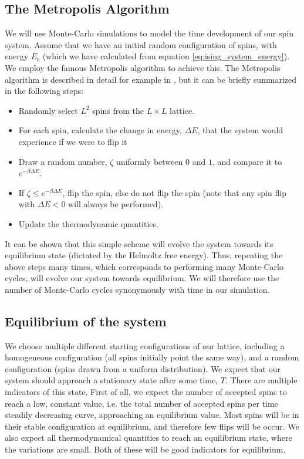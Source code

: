 \documentclass[a4paper, 10pt]{article}
\begin{document}
\subsection{The Metropolis Algorithm}\label{Monte-Carlo_algo}
We will use Monte-Carlo simulations to model the time development of our spin system. Assume that we have an initial random configuration of spins, with energy $E_b$ (which we have calculated from equation \ref{eq:ising_system_energy}). We employ the famous Metropolis algorithm to achieve this. The Metropolis algorithm is described in detail for example in \cite{Metropolis}, but it can be briefly summarized in the following steps:
\begin{itemize}
\item Randomly select $L^2$ spins from the $L\times L$ lattice.
\item For each spin, calculate the change in energy, $\Delta E$, that the system would experience if we were to flip it
\item Draw a random number, $\zeta$ uniformly between $0$ and $1$, and compare it to $e^{-\beta \Delta E}$. \item If $\zeta \leq e^{-\beta \Delta E}$, flip the spin, else do not flip the spin (note that any spin flip with $\Delta E < 0$ will always be performed).
\item Update the thermodynamic quantities.
\end{itemize}
It can be shown that this simple scheme will evolve the system towards its equilibrium state (dictated by the Helmoltz free energy). Thus, repeating the above steps many times, which corresponds to performing many Monte-Carlo cycles, will evolve our system towards equilibrium. We will therefore use the number of Monte-Carlo cycles synonymously with time in our simulation.
\subsection{Equilibrium of the system}\label{equilibrium_system}
We choose multiple different starting configurations of our lattice, including a homogeneous configuration (all spins initially point the same way), and a random configuration (spins drawn from a uniform distribution). We expect that our system should approach a stationary state after some time, $T$. There are multiple indicators of this state. First of all, we expect the number of accepted spins to reach a low, constant value, i.e. the total number of accepted spins  per time steadily decreasing curve, approaching an equilibrium value. Most spins will be in their stable configuration at equilibrium, and therefore few flips will be occur. We also expect all thermodynamical quantities to reach an equilibrium state, where the variations are small. Both of these will be good indicators for equilibrium. 
\end{document}
